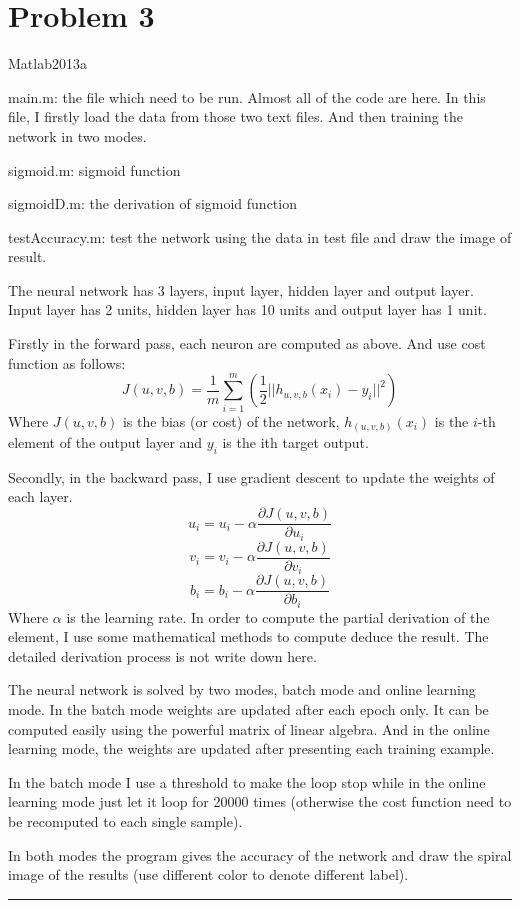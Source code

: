\documentclass[twoside]{article}
\newenvironment{solution}{{\bf Solution:}}{\hfill\rule{2mm}{2mm}}
\begin{document}
\section*{Problem 3}
\begin{solution}
	
Matlab2013a

main.m:  the file which need to be run. Almost all of the code are here. In this file, I firstly load the data from those two text files. And then training the network in two modes. 

sigmoid.m:   sigmoid function

sigmoidD.m:  the derivation of sigmoid function

testAccuracy.m:  test the network using the data in test file and draw the image of result. 

The neural network has 3 layers, input layer, hidden layer and output layer. Input layer has 2 units, hidden layer has 10 units and output layer has 1 unit.

Firstly in the forward pass, each neuron are computed as above. And use cost function as follows:
$$
J(u,v,b)=\frac{1}{m}\sum_{i=1}^{m}(\frac{1}{2}||h_{u,v,b}(x_i)-y_i||^2)
$$
Where $J(u,v,b)$ is the bias (or cost) of the network, $h_(u,v,b)(x_i)$ is the $i$-th element of the output layer and $y_i$ is the ith target output.

Secondly, in the backward pass, I use gradient descent to update the weights of each layer.
$$
u_i=u_i-\alpha\frac{\partial J(u,v,b)}{\partial u_i}
$$
$$
v_i=v_i-\alpha\frac{\partial J(u,v,b)}{\partial v_i}
$$
$$
b_i=b_i-\alpha\frac{\partial J(u,v,b)}{\partial b_i}
$$
Where $\alpha$ is the learning rate. In order to compute the partial derivation of the element, I use some mathematical methods to compute deduce the result. The detailed derivation process is not write down here.

The neural network is solved by two modes, batch mode and online learning mode. In the batch mode weights are updated after each epoch only. It can be computed easily using the powerful matrix of linear algebra. And in the online learning mode, the weights are updated after presenting each training example.

In the batch mode I use a threshold to make the loop stop while in the online learning mode just let it loop for 20000 times (otherwise the cost function need to be recomputed to each single sample).

In both modes the program gives the accuracy of the network and draw the spiral image of the results (use different color to denote different label). 


\end{solution}
\end{document}
